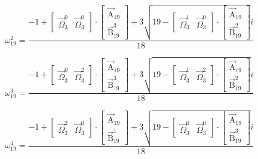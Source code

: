 \documentclass{article}
\begin{document}
\[ \omega_{19}^{2}=\frac{-1+\left[ \begin{matrix} \vec{\Omega}_{3}^{0} & \vec{\Omega}_{3}^{0} \end{matrix} \right]\cdot\left[ \begin{matrix} \vec{\mathrm{A}}_{19} \\ \vec{\mathrm{B}}_{19}^{3} \end{matrix} \right]+3\sqrt{19-\left[ \begin{matrix} \vec{\Omega}_{3}^{1} & \vec{\Omega}_{3}^{0} \end{matrix} \right]\cdot\left[ \begin{matrix} \vec{\mathrm{A}}_{19} \\ \vec{\mathrm{B}}_{19}^{2} \end{matrix} \right]}i}{18} \]

\[ \omega_{19}^{3}=\frac{-1+\left[ \begin{matrix} \vec{\Omega}_{3}^{0} & \vec{\Omega}_{3}^{2} \end{matrix} \right]\cdot\left[ \begin{matrix} \vec{\mathrm{A}}_{19} \\ \vec{\mathrm{B}}_{19}^{3} \end{matrix} \right]+3\sqrt{19-\left[ \begin{matrix} \vec{\Omega}_{3}^{1} & \vec{\Omega}_{3}^{2} \end{matrix} \right]\cdot\left[ \begin{matrix} \vec{\mathrm{A}}_{19} \\ \vec{\mathrm{B}}_{19}^{2} \end{matrix} \right]}i}{18} \]

\[ \omega_{19}^{4}=\frac{-1+\left[ \begin{matrix} \vec{\Omega}_{3}^{2} & \vec{\Omega}_{3}^{0} \end{matrix} \right]\cdot\left[ \begin{matrix} \vec{\mathrm{A}}_{19} \\ \vec{\mathrm{B}}_{19}^{1} \end{matrix} \right]+3\sqrt{19-\left[ \begin{matrix} \vec{\Omega}_{3}^{0} & \vec{\Omega}_{3}^{0} \end{matrix} \right]\cdot\left[ \begin{matrix} \vec{\mathrm{A}}_{19} \\ \vec{\mathrm{B}}_{19}^{3} \end{matrix} \right]}i}{18} \]
\end{document}
